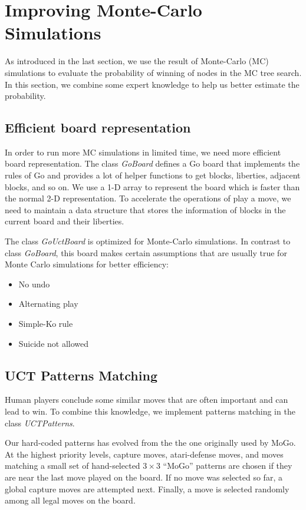 
\section{Improving Monte-Carlo Simulations}

As introduced in the last section, we use the result of Monte-Carlo (MC) simulations to evaluate the probability of winning of nodes in the MC tree search. In this section, we combine some expert knowledge to help us better estimate the probability.

\subsection{Efficient board representation}

In order to run more MC simulations in limited time, we need more efficient board representation. The class \emph{GoBoard} defines a Go board that implements the rules of Go and provides a lot of helper functions to get blocks, liberties, adjacent blocks, and so on. We use a 1-D array to represent the board which is faster than the normal 2-D representation. To accelerate the operations of play a move, we need to maintain a data structure that stores the information of blocks in the current board and their liberties.

The class \emph{GoUctBoard} is optimized for Monte-Carlo simulations. In contrast to class \emph{GoBoard}, this board makes certain assumptions that are usually true for Monte Carlo simulations for better efficiency:
\begin{itemize}
  \item No undo
  \item Alternating play
  \item Simple-Ko rule
  \item Suicide not allowed
\end{itemize}

\subsection{UCT Patterns Matching}

Human players conclude some similar moves that are often important and can lead to win. To combine this knowledge, we implement patterns matching in the class \emph{UCTPatterns}.

Our hard-coded patterns has evolved from the the one originally used by MoGo\cite{gelly2007contribution}. At the highest priority levels, capture moves, atari-defense moves, and moves matching a small set of hand-selected $3 \times 3$ ``MoGo'' patterns are chosen if they are near the last move played on the board. If no move was selected so far, a global capture moves are attempted next. Finally, a move is selected randomly among all legal moves on the board.

